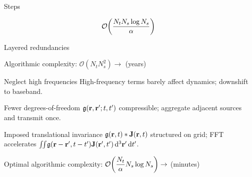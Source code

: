\documentclass[aspectratio=169, usenames, dvipsnames]{beamer}
\begin{document}
\begin{frame}{Steps}
\begin{center}
  \end{center}
\end{frame}

\begin{frame}[standout]
  \begingroup
    \Huge
    \begin{equation*}
      \mathcal{O}\qty(\frac{N_t N_s \log N_s}{\alpha})
    \end{equation*}
  \endgroup
\end{frame}

\begin{frame}{Layered redundancies}
  \begin{center}
    Algorithmic complexity: $\displaystyle\mathcal{O}(N_t N_s^2) \to$ \alert{(years)}
  \end{center}
  \begin{block}{Neglect high frequencies}
    High-frequency terms barely affect dynamics; downshift to baseband.
  \end{block}
  \begin{block}{Fewer degrees-of-freedom}
    $\mathfrak{g}(\vb{r}, \vb{r}'; t, t')$ compressible; aggregate adjacent sources and transmit once.
  \end{block}
  \begin{block}{Imposed translational invariance}
    $\mathfrak{g}(\vb{r}, t) * \vb{J}(\vb{r}, t)$ structured on grid; FFT accelerates $\iint_{}\mathfrak{g}(\vb{r} - \vb{r}', t - t') \vb{J}(\vb{r'}, t') \dd[3]{\vb{r}'} \dd{t'}$.
  \end{block}
  \begin{center}
    Optimal algorithmic complexity: $\displaystyle\mathcal{O}\qty(\frac{N_t}{\alpha} N_s \log N_s) \to$ \alert{(minutes)}
  \end{center}
\end{frame}
\end{document}
